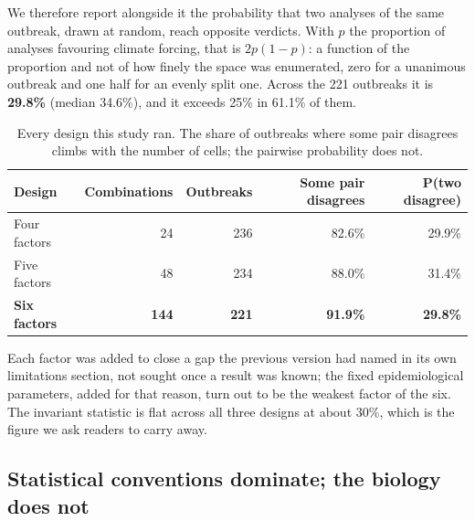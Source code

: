 \documentclass[11pt,a4paper]{article}
\begin{document}
We therefore report alongside it the probability that two analyses of the same
outbreak, drawn at random, reach opposite verdicts. With $p$ the proportion of
analyses favouring climate forcing, that is $2p(1-p)$: a function of the
proportion and not of how finely the space was enumerated, zero for a unanimous
outbreak and one half for an evenly split one. Across the 221 outbreaks it is
\textbf{29.8\%} (median 34.6\%), and it exceeds 25\% in 61.1\% of them.

\begin{table}[htbp]
\centering
\caption{Every design this study ran. The share of outbreaks where some pair
disagrees climbs with the number of cells; the pairwise probability does not.}
\begin{tabular}{lrrrr}
\toprule
Design & Combinations & Outbreaks & Some pair disagrees & P(two disagree) \\
\midrule
Four factors & 24 & 236 & 82.6\% & 29.9\% \\
Five factors & 48 & 234 & 88.0\% & 31.4\% \\
\textbf{Six factors} & \textbf{144} & \textbf{221} & \textbf{91.9\%} & \textbf{29.8\%} \\
\bottomrule
\end{tabular}
\end{table}

Each factor was added to close a gap the previous version had named in its own
limitations section, not sought once a result was known; the fixed
epidemiological parameters, added for that reason, turn out to be the weakest
factor of the six. The invariant statistic is flat across all three designs at
about 30\%, which is the figure we ask readers to carry away.

\subsection{Statistical conventions dominate; the biology does not}
\end{document}
